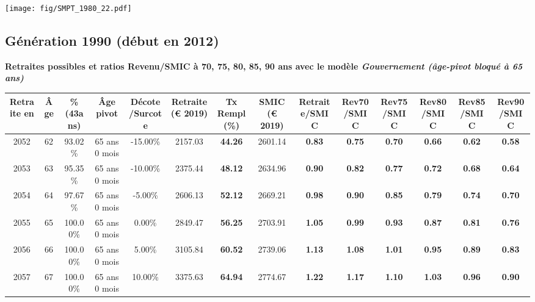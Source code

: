  \vspace{0.1cm} 

 \begin{center}\texttt{[image: fig/SMPT\_1980\_22.pdf]}\end{center} \label{fig/SMPT_1980_22.pdf} 

\newpage 
 
\subsection{Génération 1990 (début en 2012)} 

{\bf \noindent Retraites possibles et ratios Revenu/SMIC à 70, 75, 80, 85, 90 ans avec le modèle \emph{Gouvernement (âge-pivot bloqué à 65 ans)}}  
 
\begin{adjustbox}{max width=\textwidth} 
\begin{tabular}[htb]{|c|c||c|c|c||c|c||c||c|c|c|c|c|c|} 
\hline 
 Retraite en &  Âge &  \%(43ans) &  Âge pivot &  Décote/Surcote &  Retraite (\euro{} 2019) &  Tx Rempl(\%) &  SMIC (\euro{} 2019) &  Retraite/SMIC &  Rev70/SMIC &  Rev75/SMIC &  Rev80/SMIC &  Rev85/SMIC &  Rev90/SMIC \\ 
\hline \hline 
 2052 &  62 &  93.02\% &  65 ans 0 mois &  -15.00\% &  2157.03 &  {\bf 44.26} &  2601.14 &  {\bf {\color{red} 0.83}} &  {\bf {\color{red} 0.75}} &  {\bf {\color{red} 0.70}} &  {\bf {\color{red} 0.66}} &  {\bf {\color{red} 0.62}} &  {\bf {\color{red} 0.58}} \\ 
\hline 
 2053 &  63 &  95.35\% &  65 ans 0 mois &  -10.00\% &  2375.44 &  {\bf 48.12} &  2634.96 &  {\bf {\color{red} 0.90}} &  {\bf {\color{red} 0.82}} &  {\bf {\color{red} 0.77}} &  {\bf {\color{red} 0.72}} &  {\bf {\color{red} 0.68}} &  {\bf {\color{red} 0.64}} \\ 
\hline 
 2054 &  64 &  97.67\% &  65 ans 0 mois &  -5.00\% &  2606.13 &  {\bf 52.12} &  2669.21 &  {\bf {\color{red} 0.98}} &  {\bf {\color{red} 0.90}} &  {\bf {\color{red} 0.85}} &  {\bf {\color{red} 0.79}} &  {\bf {\color{red} 0.74}} &  {\bf {\color{red} 0.70}} \\ 
\hline 
 2055 &  65 &  100.00\% &  65 ans 0 mois &  0.00\% &  2849.47 &  {\bf 56.25} &  2703.91 &  {\bf 1.05} &  {\bf {\color{red} 0.99}} &  {\bf {\color{red} 0.93}} &  {\bf {\color{red} 0.87}} &  {\bf {\color{red} 0.81}} &  {\bf {\color{red} 0.76}} \\ 
\hline 
 2056 &  66 &  100.00\% &  65 ans 0 mois &  5.00\% &  3105.84 &  {\bf 60.52} &  2739.06 &  {\bf 1.13} &  {\bf 1.08} &  {\bf 1.01} &  {\bf {\color{red} 0.95}} &  {\bf {\color{red} 0.89}} &  {\bf {\color{red} 0.83}} \\ 
\hline 
 2057 &  67 &  100.00\% &  65 ans 0 mois &  10.00\% &  3375.63 &  {\bf 64.94} &  2774.67 &  {\bf 1.22} &  {\bf 1.17} &  {\bf 1.10} &  {\bf 1.03} &  {\bf {\color{red} 0.96}} &  {\bf {\color{red} 0.90}} \\ 
\hline 
\hline 
\end{tabular} 
\end{adjustbox} 
 
